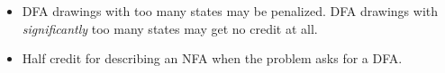 \documentclass[11pt]{article}
\begin{document}
\begin{enumerate}
\begin{rubric}
\begin{itemize}
\item 
DFA drawings with too many states may be penalized.  DFA drawings with \emph{significantly} too many states may get no credit at all.

\item 
Half credit for describing an NFA when the problem asks for a DFA.
\end{itemize}
\end{rubric}



\end{enumerate}
\end{document}
